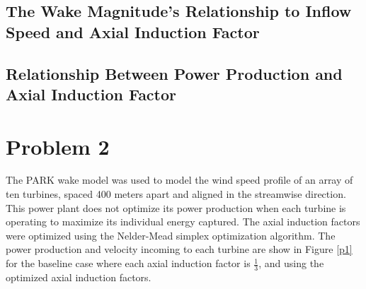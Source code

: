 \documentclass{article}
\begin{document}
\subsection{The Wake Magnitude's Relationship to Inflow Speed and Axial Induction Factor}
\subsection{Relationship Between Power Production and Axial Induction Factor}
\section{Problem 2}
The PARK wake model was used to model the 
wind speed profile of an array of ten turbines, spaced 400 meters apart and aligned in the streamwise direction. This power plant does not optimize its power production when each turbine is operating to maximize its individual energy captured. The axial induction factors were optimized using the Nelder-Mead simplex optimization algorithm. The power production and velocity incoming to each turbine are show in Figure \ref{p1} for the baseline case where each axial induction factor is $\frac{1}{3}$, and using the optimized axial induction factors. 
\end{document}

